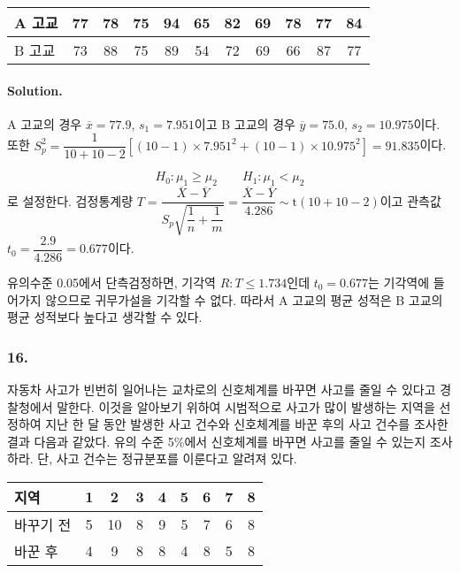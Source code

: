 \begin{center}
    \begin{tabular}{l|cccccccccc}
        \hline
        A 고교 & 77 & 78 & 75 & 94 & 65 & 82 & 69 & 78 & 77 & 84 \\
        \hline
        B 고교 & 73 & 88 & 75 & 89 & 54 & 72 & 69 & 66 & 87 & 77 \\
        \hline
    \end{tabular}
\end{center}

\paragraph{Solution.} A 고교의 경우 $\overline{x}=77.9$, $s_1=7.951$이고 B 고교의 경우 $\overline{y}=75.0$, $s_2=10.975$이다.
또한 $S_p^2=\dfrac{1}{10+10-2}\left[\left(10-1\right)\times7.951^2+\left(10-1\right)\times10.975^2\right]=91.835$이다.

\[H_0:\mu_1\geq\mu_2 \qquad H_1:\mu_1<\mu_2\]
로 설정한다. 검정통계량 $T=\dfrac{\overline{X}-\overline{Y}}{S_p\sqrt{\dfrac{1}{n}+\dfrac{1}{m}}}
=\dfrac{\overline{X}-\overline{Y}}{4.286} \sim \mathrm{t}\left(10+10-2\right)$이고 관측값 $t_0=\dfrac{2.9}{4.286}=0.677$이다.

유의수준 0.05에서 단측검정하면, 기각역 $R:T \leq 1.734$인데
$t_0=0.677$는 기각역에 들어가지 않으므로 귀무가설을 기각할 수 없다. 따라서 A 고교의 평균 성적은 B 고교의 평균 성적보다 높다고 생각할 수 있다.

\subsubsection{16.} 자동차 사고가 빈번히 일어나는 교차로의 신호체계를 바꾸면 사고를 줄일 수 있다고 경찰청에서 말한다. 이것을 알아보기 위하여
시범적으로 사고가 많이 발생하는 지역을 선정하여 지난 한 달 동안 발생한 사고 건수와 신호체계를 바꾼 후의 사고 건수를 조사한 결과 다음과 같았다.
유의 수준 5\%에서 신호체계를 바꾸면 사고를 줄일 수 있는지 조사하라. 단, 사고 건수는 정규분포를 이룬다고 알려져 있다.

\begin{center}
    \begin{tabular}{l|cccccccc}
        \hline
        지역 & 1 & 2 & 3 & 4 & 5 & 6 & 7 & 8 \\
        \hline
        바꾸기 전 & 5 & 10 & 8 & 9 & 5 & 7 & 6 & 8 \\
        바꾼 후 & 4 & 9 & 8 & 8 & 4 & 8 & 5 & 8 \\
        \hline
    \end{tabular}
\end{center}

